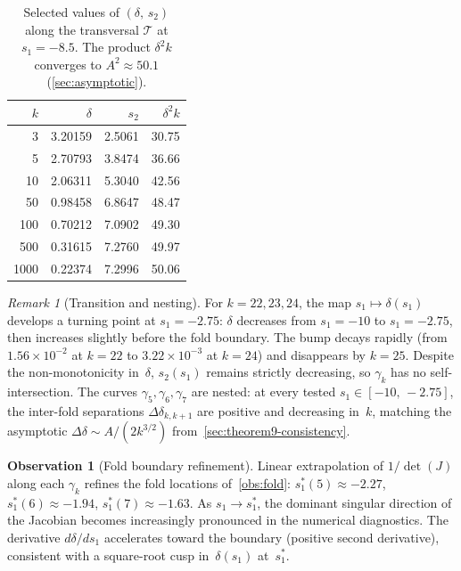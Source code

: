 \documentclass[11pt,a4paper]{article}
\theoremstyle{plain}
\theoremstyle{definition}
\newtheorem{observation}[theorem]{Observation}
\theoremstyle{remark}
\newtheorem{remark}[theorem]{Remark}
\begin{document}
\begin{table}[ht]
\centering
\caption{Selected values of $(\delta,\, s_2)$ along the
  transversal $\mathcal{T}$ at $s_1 = -8.5$.  The product
  $\delta^2 k$ converges to $A^2 \approx 50.1$
  (\cref{sec:asymptotic}).}
\label{tab:transversal}
\smallskip
\begin{tabular}{@{}r@{\quad}r@{\quad}r@{\quad}r@{}}
\toprule
$k$ & $\delta$ & $s_2$ & $\delta^2 k$ \\
\midrule
3    & 3.20159 & 2.5061 & 30.75 \\
5    & 2.70793 & 3.8474 & 36.66 \\
10   & 2.06311 & 5.3040 & 42.56 \\
50   & 0.98458 & 6.8647 & 48.47 \\
100  & 0.70212 & 7.0902 & 49.30 \\
500  & 0.31615 & 7.2760 & 49.97 \\
1000 & 0.22374 & 7.2996 & 50.06 \\
\bottomrule
\end{tabular}
\end{table}

\begin{remark}[Transition and nesting]
\label{obs:transition}
For $k = 22, 23, 24$, the map $s_1 \mapsto \delta(s_1)$
develops a turning point at $s_1 = -2.75$: $\delta$ decreases
from $s_1 = -10$ to $s_1 = -2.75$, then increases slightly
before the fold boundary.  The bump decays rapidly
(from $1.56 \times 10^{-2}$ at $k=22$ to
$3.22 \times 10^{-3}$ at $k=24$) and disappears by $k = 25$.
Despite the non-monotonicity in~$\delta$, $s_2(s_1)$ remains
strictly decreasing, so $\gamma_k$ has no self-intersection.
The curves $\gamma_5, \gamma_6, \gamma_7$ are nested:
at every tested $s_1 \in [-10,\, -2.75]$, the inter-fold
separations $\Delta\delta_{k,k+1}$ are positive and
decreasing in~$k$, matching the asymptotic
$\Delta\delta \sim A/(2k^{3/2})$
from~\cref{sec:theorem9-consistency}.
\end{remark}

\begin{observation}[Fold boundary refinement]
\label{obs:fold-refined}
Linear extrapolation of $1/\det(J)$ along each
$\gamma_k$ refines the fold locations
of~\cref{obs:fold}:
$s_1^*(5) \approx -2.27$,
$s_1^*(6) \approx -1.94$,
$s_1^*(7) \approx -1.63$.
As $s_1 \to s_1^*$, the dominant singular direction of the Jacobian
becomes increasingly pronounced in the numerical diagnostics.
The derivative $d\delta/ds_1$ accelerates toward the boundary
(positive second derivative), consistent with a
square-root cusp in~$\delta(s_1)$ at~$s_1^*$.
\end{observation}
\end{document}
